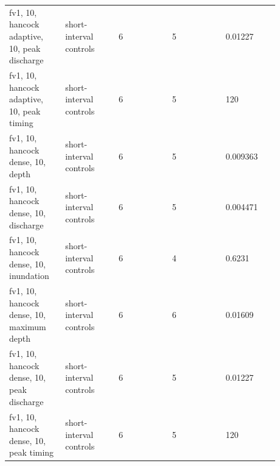 \begin{longtable}{p{0.1760\linewidth}p{0.1760\linewidth}p{0.1760\linewidth}p{0.1760\linewidth}p{0.1760\linewidth}}
fv1, 10, hancock adaptive, 10, peak discharge & short-interval controls & 6 & 5 & 0.01227 \\
fv1, 10, hancock adaptive, 10, peak timing & short-interval controls & 6 & 5 & 120 \\
fv1, 10, hancock dense, 10, depth & short-interval controls & 6 & 5 & 0.009363 \\
fv1, 10, hancock dense, 10, discharge & short-interval controls & 6 & 5 & 0.004471 \\
fv1, 10, hancock dense, 10, inundation & short-interval controls & 6 & 4 & 0.6231 \\
fv1, 10, hancock dense, 10, maximum depth & short-interval controls & 6 & 6 & 0.01609 \\
fv1, 10, hancock dense, 10, peak discharge & short-interval controls & 6 & 5 & 0.01227 \\
fv1, 10, hancock dense, 10, peak timing & short-interval controls & 6 & 5 & 120 \\
\end{longtable}
